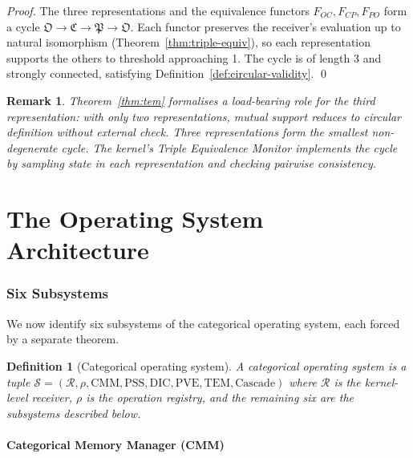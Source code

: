 \documentclass[twocolumn,a4paper]{article}
\newtheorem{definition}[theorem]{Definition}
\newtheorem{remark}[theorem]{Remark}
\newcommand{\receiver}{\mathcal{R}}
\newcommand{\OOsc}{\mathfrak{O}}
\newcommand{\CCat}{\mathfrak{C}}
\newcommand{\PPart}{\mathfrak{P}}
\begin{document}
\begin{proof}
The three representations and the equivalence functors $F_{OC},F_{CP},F_{PO}$ form a cycle $\OOsc\to\CCat\to\PPart\to\OOsc$. Each functor preserves the receiver's evaluation up to natural isomorphism (Theorem~\ref{thm:triple-equiv}), so each representation supports the others to threshold approaching 1. The cycle is of length 3 and strongly connected, satisfying Definition~\ref{def:circular-validity}. \qed
\end{proof}

\begin{remark}
Theorem~\ref{thm:tem} formalises a load-bearing role for the third representation: with only two representations, mutual support reduces to circular definition without external check. Three representations form the smallest non-degenerate cycle. The kernel's Triple Equivalence Monitor implements the cycle by sampling state in each representation and checking pairwise consistency.
\end{remark}

\part{The Operating System Architecture}

\section{Six Subsystems}
\label{sec:six-subsystems}

We now identify six subsystems of the categorical operating system, each forced by a separate theorem.

\begin{definition}[Categorical operating system]
\label{def:cos}
A \emph{categorical operating system} is a tuple $\mathcal{S}=(\receiver,\rho,\mathrm{CMM},\mathrm{PSS},\mathrm{DIC},\mathrm{PVE},\mathrm{TEM},\mathrm{Cascade})$ where $\receiver$ is the kernel-level receiver, $\rho$ is the operation registry, and the remaining six are the subsystems described below.
\end{definition}

\subsection{Categorical Memory Manager (CMM)}
\end{document}
